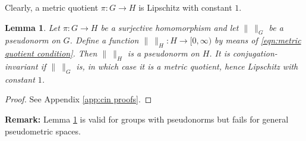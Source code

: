 \documentclass[12pt]{amsart}
\newtheorem{lemma}[prop]{Lemma}
\theoremstyle{definition}
\newtheorem*{remarkx}{Remark}
\begin{document}
Clearly, a metric quotient $\pi \colon G \to H$ is Lipschitz with constant $1$.



\begin{lemma}\label{L:quotient pseudonorm}
Let $\pi \colon G \to H$ be a surjective homomorphism and let $\| \ \|_G$ be a pseudonorm on $G$.
Define a function $\| \ \|_H \colon H \to [0,\infty)$ %
by means of \eqref{eqn:metric quotient condition}.
Then $\| \ \|_H$ is a pseudonorm on $H$.
It is conjugation-invariant if $\| \ \|_G$ is, in which case it is a metric quotient, hence Lipschitz with constant $1$.
\end{lemma}

\begin{proof}
See Appendix \ref{app:cin proofs}.

\end{proof}


\medskip
\noindent
{\bf Remark:}
Lemma \ref{L:quotient pseudonorm} is valid for groups with pseudonorms but fails for general pseudometric spaces.
\end{document}
